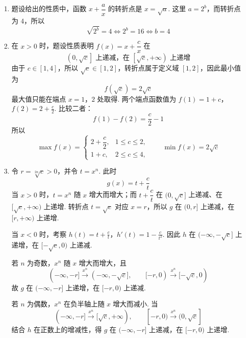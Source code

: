 \begin{solution}
\begin{enumerate}
\item 题设给出的性质中，函数 \(x+\dfrac{a}{x}\) 的转折点是 \(x=\sqrt a\). 这里 \(a=2^b\)，而转折点为 \(4\)，所以
\[
\sqrt{2^b}=4
\iff 2^b=16
\iff b=4
\]
\item 在 \(x>0\) 时，题设性质表明 \(f(x)=x+\dfrac{c}{x}\) 在
\[
\left(0,\sqrt c\right]\text{ 上递减，在 }\left[\sqrt c,+\infty\right)\text{ 上递增}
\]
由于 \(c\in[1,4]\)，所以 \(\sqrt c\in[1,2]\)，转折点属于定义域 \([1,2]\)，因此最小值为
\[
f(\sqrt c)=2\sqrt c
\]
最大值只能在端点 \(x=1\)，\(2\) 处取得. 两个端点函数值为
\(f(1)=1+c\)，\(f(2)=2+\frac c2\).
比较二者：
\[
f(1)-f(2)=\frac c2-1
\]
所以
\[
\max f(x)=
\begin{cases}
2+\dfrac c2,&1\leqslant c\leqslant2,\\
1+c,&2\leqslant c\leqslant4,
\end{cases}
\qquad
\min f(x)=2\sqrt c
\]
\item 令 \(r=\sqrt[2n]{c}>0\)，并令 \(t=x^n\). 此时
\[
g(x)=t+\frac ct
\]
当 \(x>0\) 时，\(t=x^n\) 随 \(x\) 增大而增大；而 \(t+\dfrac ct\) 在
\((0,\sqrt c]\) 上递减、在 \([\sqrt c,+\infty)\) 上递增. 转折点
\(t=\sqrt c\) 对应 \(x=r\)，所以 \(g\) 在 \((0,r]\) 上递减，在
\([r,+\infty)\) 上递增.

当 \(x<0\) 时，考察
\(h(t)=t+\frac ct\)，\(h'(t)=1-\frac{c}{t^2}\).
因此 \(h\) 在 \((-\infty,-\sqrt c]\) 上递增，在
\([-\sqrt c,0)\) 上递减.

若 \(n\) 为奇数，\(x^n\) 随 \(x\) 增大而增大，且
\[
(-\infty,-r]\xrightarrow{x^n}(-\infty,-\sqrt c],\qquad
[-r,0)\xrightarrow{x^n}[-\sqrt c,0)
\]
故 \(g\) 在 \((-\infty,-r]\) 上递增，在 \([-r,0)\) 上递减.

若 \(n\) 为偶数，\(x^n\) 在负半轴上随 \(x\) 增大而减小. 当
\[
(-\infty,-r]\xrightarrow{x^n}[\sqrt c,+\infty),\qquad
[-r,0)\xrightarrow{x^n}(0,\sqrt c]
\]
结合 \(h\) 在正数上的增减性，得 \(g\) 在
\((-\infty,-r]\) 上递减，在 \([-r,0)\) 上递增.
\end{enumerate}
\end{solution}
